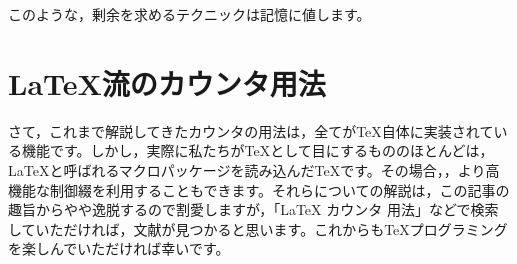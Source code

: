 \documentclass[autodetect-engine,dvipdfmx]{jsarticle}
\begin{document}
このような，剰余を求めるテクニックは記憶に値します。

\part{\LaTeX 流のカウンタ用法}

さて，これまで解説してきたカウンタの用法は，全てが\TeX 自体に実装されている機能です。しかし，実際に私たちが\TeX として目にするもののほとんどは，\LaTeX と呼ばれるマクロパッケージを読み込んだ\TeX です。その場合，\verb@{}\verb@{}，より高機能な制御綴を利用することもできます。それらについての解説は，この記事の趣旨からやや逸脱するので割愛しますが，「\LaTeX{} カウンタ 用法」などで検索していただければ，文献が見つかると思います。これからも\TeX プログラミングを楽しんでいただければ幸いです。
\end{document}
